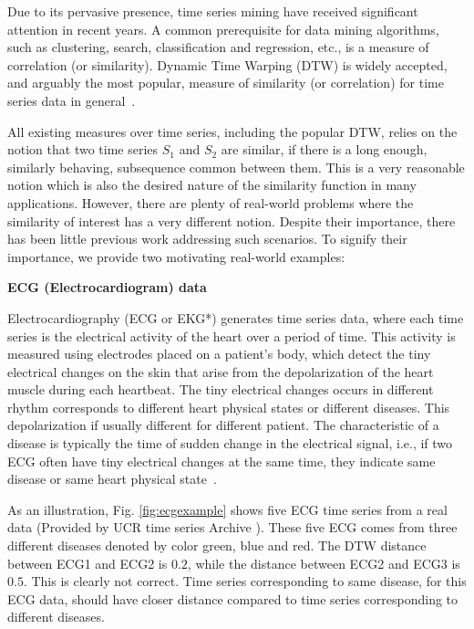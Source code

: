 Due to its pervasive presence, time series mining have received significant attention in recent years. A common prerequisite for data mining algorithms, such as clustering, search, classification and regression, etc., is a measure of correlation (or similarity). Dynamic Time Warping (DTW) is widely accepted, and arguably the most popular, measure of similarity (or correlation) for time series data in general~\cite{rakthanmanon2012searching, muller2007dynamic, chen2013dtw}.

All existing measures over time series, including the popular DTW, relies on the notion that two time series $S_1$ and $S_2$ are similar, if there is a long enough, similarly behaving, subsequence common between them. This is a very reasonable notion which is also the desired nature of the similarity function in many applications.  However, there are plenty of real-world problems where the similarity of interest has a very different notion. Despite their importance, there has been little previous work addressing such scenarios. To signify their importance, we provide two motivating real-world examples:


\textbf{ECG (Electrocardiogram) data}

Electrocardiography \cite{holter1961new} (ECG or EKG*) generates time series data, where each time series is the electrical activity of the heart over a period of time. This activity is measured using electrodes placed on a patient's body, which detect the tiny electrical changes on the skin that arise from the depolarization of the heart muscle during each heartbeat. The tiny electrical changes occurs in different rhythm corresponds to different heart physical states or different diseases. This depolarization  if usually different for different patient. The characteristic of a disease is typically the time of sudden change in the electrical signal, i.e., if two ECG often have tiny electrical changes at the same time, they indicate same disease or same heart physical state~\cite{marriott1988practical}.


As an illustration, Fig. \ref{fig:ecgexample} shows five ECG time series from a real data (Provided by UCR time series Archive \cite{UCRArchive}). These five ECG comes from three different diseases denoted by color green, blue and red.  The DTW distance between ECG1 and ECG2 is $0.2$, while the distance between ECG2 and ECG3 is $0.5$. This is clearly not correct. Time series corresponding to same disease, for this ECG data, should have closer distance compared to time series corresponding to different diseases. 

